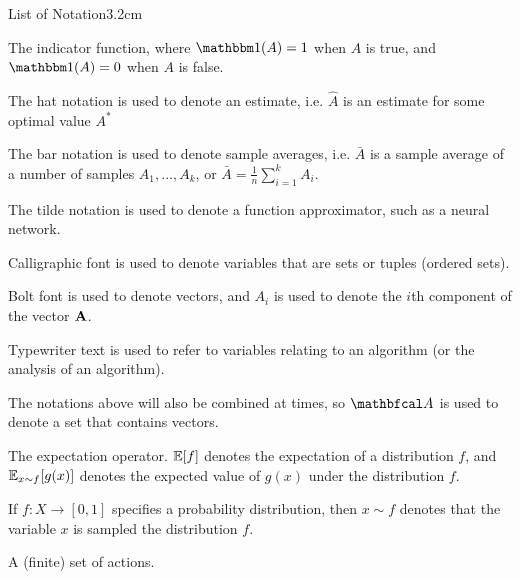 \begin{mclistof}{List of Notation}{3.2cm}
    \item[\Large\textbf{General Notation}\hfill\hfill]
    \item[$\one$] 
        The indicator function, where $\one(A)=1$ when $A$ is true, and $\one(A)=0$ when $A$ is false. 
    \item[$\hat{A}$] 
        The hat notation is used to denote an estimate, i.e. $\hat{A}$ is an estimate for some optimal value $A^*$
    \item[$\bar{A}$] 
        The bar notation is used to denote sample averages, i.e. $\bar{A}$ is a sample average of a number of samples $A_1,...,A_k$, or $\bar{A}=\frac{1}{n}\sum_{i=1}^k A_i$.
    \item[$\tilde{A}$] 
        The tilde notation is used to denote a function approximator, such as a neural network.
    \item[$\cl{A}$] 
        Calligraphic font is used to denote variables that are sets or tuples (ordered sets).
    \item[$\bff{A}$] 
        Bolt font is used to denote vectors, and $A_i$ is used to denote the $i$th component of the vector $\bff{A}$.
    \item[$\texttt{A}$]
        Typewriter text is used to refer to variables relating to an algorithm (or the analysis of an algorithm).
    \item[$\bfcl{A}$] 
        The notations above will also be combined at times, so $\bfcl{A}$ is used to denote a set that contains vectors.
    \item[$\bb{E}$] 
        The expectation operator. $\mathbb{E}[f]$ denotes the expectation of a distribution $f$, and $\mathbb{E}_{x\sim f}[g(x)]$ denotes the expected value of $g(x)$ under the distribution $f$.
    \item[$x\sim f$] 
        If $f:X\rightarrow[0,1]$ specifies a probability distribution, then $x\sim f$ denotes that the variable $x$ is sampled the distribution $f$.
    \\
    \item[{\parbox[t]{\textwidth}{
            \Large\textbf{(Multi-Objective) Markov Decision Processes \\(Defined in Sections \ref{sec:2-2-mdps} and \ref{sec:2-5-morl})}\hfill\hfill
          }}]
    \item[$\cl{A}$]
        A (finite) set of actions.
    \item[$a_t$]

\end{mclistof}
